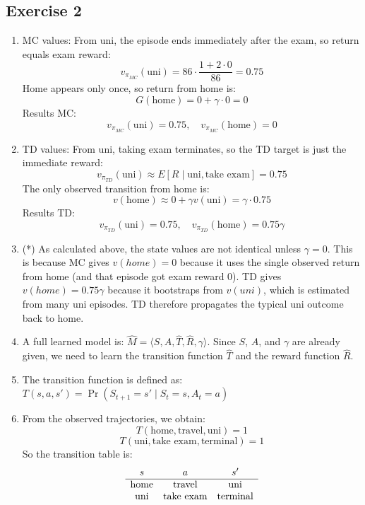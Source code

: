 \documentclass{article}
\begin{document}
\subsection*{Exercise 2}
\begin{enumerate}
    \item MC values: From uni, the episode ends immediately after the exam, so return equals exam reward:
    \[v_{\pi_{MC}}(\text{uni}) = 86 \cdot \frac{1 + 2 \cdot 0}{86} = 0.75\]
    Home appears only once, so return from home is: 
    \[G(\text{home}) = 0 + \gamma \cdot 0 = 0\]
    Results MC: \[v_{\pi_{MC}}(\text{uni}) = 0.75, \quad v_{\pi_{MC}}(\text{home}) = 0\]

    \item  TD values: From uni, taking exam terminates, so the TD target is just the immediate reward: 
    \[v_{\pi_{TD}}(\text{uni}) \approx  {E}[R \mid \text{uni}, \text{take exam}] = 0.75\]
    The only observed transition from home is:
    \[v(\text{home}) \approx 0 + \gamma v(\text{uni}) = \gamma \cdot 0.75\]
    Results TD: \[v_{\pi_{TD}}(\text{uni}) = 0.75, \quad v_{\pi_{TD}}(\text{home}) = 0.75\gamma\]

    \item (*) As calculated above, the state values are not identical unless $\gamma = 0$. This is because MC gives $v(home) = 0$ because it uses the single observed return from home (and that episode got exam reward 0). TD gives $v(home)=0.75\gamma$ because it bootstraps from $v(uni)$, which is estimated from many uni episodes. TD therefore propagates the typical uni outcome back to home.

    \item A full learned model is: $\hat{M} = \langle S, A, \hat{T}, \hat{R}, \gamma \rangle$. Since $S$, $A$, and $\gamma$ are already given, we need to learn the transition function $\hat{T}$ and the reward function $\hat{R}$.

    \item The transition function is defined as: $T(s,a,s') = \Pr(S_{t+1} = s' \mid S_t = s, A_t = a)$

    \item From the observed trajectories, we obtain:
    \[
    T(\text{home}, \text{travel}, \text{uni}) = 1
    \]
    \[
    T(\text{uni}, \text{take exam}, \text{terminal}) = 1
    \]
    So the transition table is:
    \[
    \begin{array}{c c c}
    s & a & s' \\
    \hline
    \text{home} & \text{travel} & \text{uni} \\
    \text{uni} & \text{take exam} & \text{terminal}
    \end{array}
    \]


\end{enumerate}
\end{document}
